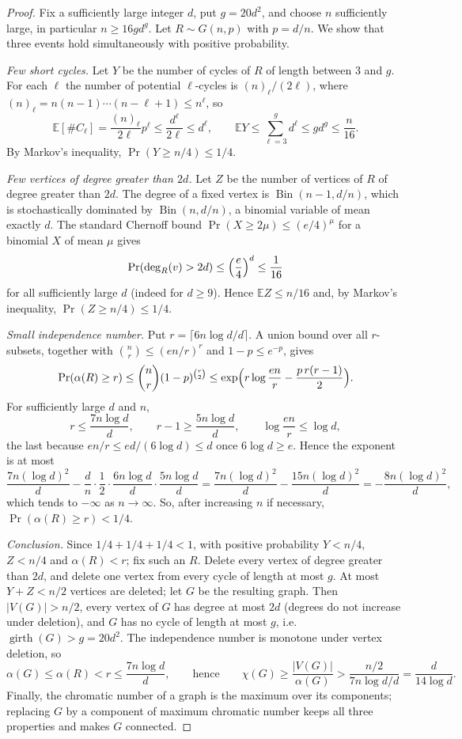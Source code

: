 \documentclass[11pt,a4paper]{article}
\theoremstyle{plain}
\theoremstyle{definition}
\theoremstyle{remark}
\newcommand{\E}{\mathbb E}
\DeclareMathOperator{\girth}{girth}
\DeclareMathOperator{\Bin}{Bin}
\begin{document}
\label{pf:erdos}
\lemerdos*
\begin{proof}
Fix a sufficiently large integer $d$, put $g=20d^2$, and choose $n$ sufficiently large, in particular $n\ge16gd^g$. Let $R\sim G(n,p)$ with $p=d/n$. We show that three events hold simultaneously with positive probability.

\emph{Few short cycles.} Let $Y$ be the number of cycles of $R$ of length between $3$ and $g$. For each $\ell$ the number of potential $\ell$-cycles is $(n)_\ell/(2\ell)$, where $(n)_\ell=n(n-1)\cdots(n-\ell+1)\le n^\ell$, so
\[
 \E[\#C_\ell]=\frac{(n)_\ell}{2\ell}p^\ell\le\frac{d^\ell}{2\ell}\le d^\ell,
 \qquad
 \E Y\le\sum_{\ell=3}^{g}d^\ell\le gd^g\le\frac n{16}.
\]
By Markov's inequality, $\Pr(Y\ge n/4)\le1/4$.

\emph{Few vertices of degree greater than $2d$.} Let $Z$ be the number of vertices of $R$ of degree greater than $2d$. The degree of a fixed vertex is $\Bin(n-1,d/n)$, which is stochastically dominated by $\Bin(n,d/n)$, a binomial variable of mean exactly $d$. The standard Chernoff bound $\Pr(X\ge2\mu)\le(e/4)^{\mu}$ for a binomial $X$ of mean $\mu$ gives
\[
 \Pr(\deg_R(v)>2d)\le\Bigl(\frac e4\Bigr)^{d}\le\frac1{16}
\]
for all sufficiently large $d$ (indeed for $d\ge9$). Hence $\E Z\le n/16$ and, by Markov's inequality, $\Pr(Z\ge n/4)\le1/4$.

\emph{Small independence number.} Put $r=\lceil6n\log d/d\rceil$. A union bound over all $r$-subsets, together with $\binom nr\le(en/r)^r$ and $1-p\le e^{-p}$, gives
\[
 \Pr(\alpha(R)\ge r)\le\binom nr(1-p)^{\binom r2}
 \le\exp\Bigl(r\log\frac{en}{r}-\frac{p\,r(r-1)}2\Bigr).
\]
For sufficiently large $d$ and $n$,
\[
 r\le\frac{7n\log d}{d},\qquad r-1\ge\frac{5n\log d}{d},\qquad \log\frac{en}{r}\le\log d ,
\]
the last because $en/r\le ed/(6\log d)\le d$ once $6\log d\ge e$. Hence the exponent is at most
\[
 \frac{7n(\log d)^2}{d}-\frac dn\cdot\frac12\cdot\frac{6n\log d}{d}\cdot\frac{5n\log d}{d}
 =\frac{7n(\log d)^2}{d}-\frac{15n(\log d)^2}{d}
 =-\frac{8n(\log d)^2}{d},
\]
which tends to $-\infty$ as $n\to\infty$. So, after increasing $n$ if necessary, $\Pr(\alpha(R)\ge r)<1/4$.

\emph{Conclusion.} Since $1/4+1/4+1/4<1$, with positive probability $Y<n/4$, $Z<n/4$ and $\alpha(R)<r$; fix such an $R$. Delete every vertex of degree greater than $2d$, and delete one vertex from every cycle of length at most $g$. At most $Y+Z<n/2$ vertices are deleted; let $G$ be the resulting graph. Then $|V(G)|>n/2$, every vertex of $G$ has degree at most $2d$ (degrees do not increase under deletion), and $G$ has no cycle of length at most $g$, i.e.\ $\girth(G)>g=20d^2$. The independence number is monotone under vertex deletion, so
\[
 \alpha(G)\le\alpha(R)<r\le\frac{7n\log d}{d},
 \qquad\text{hence}\qquad
 \chi(G)\ge\frac{|V(G)|}{\alpha(G)}>\frac{n/2}{7n\log d/d}=\frac{d}{14\log d}.
\]
Finally, the chromatic number of a graph is the maximum over its components; replacing $G$ by a component of maximum chromatic number keeps all three properties and makes $G$ connected.
\end{proof}
\end{document}
